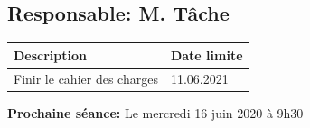 \documentclass[11pt]{meetingmins}
\begin{document}
\subsection{Responsable: M. Tâche}

\begin{table}[ht]
    \begin{tabularx}{\columnwidth}{ | X | p{8em} |}
        \hline
        \textbf{Description} & \textbf{Date limite} \\
        \hline
        Finir le cahier des charges & 11.06.2021 \\
        \hline
    \end{tabularx}
\end{table}

\vspace{1em}
\par \noindent \textbf {Prochaine séance:} Le mercredi 16 juin 2020 à 9h30
\end{document}
